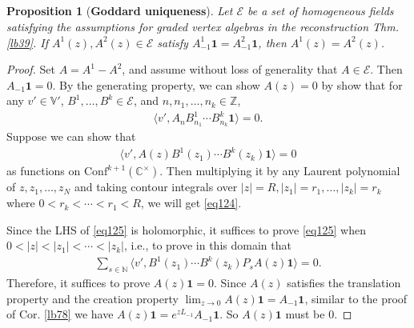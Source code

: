 \documentclass[11pt,b5paper,notitlepage]{article}
\theoremstyle{definition}
\theoremstyle{plain}
\newtheorem{pp}[df]{Proposition}
\newcommand{\mc}{\mathcal}
\newcommand{\id}{\mathbf{1}}
\newcommand{\Conf}{\mathrm{Conf}}
\newcommand{\bk}[1]{\langle {#1}\rangle}
\newcommand{\Vbb}{\mathbb V}
\newcommand{\Cbb}{\mathbb C}
\newcommand{\Nbb}{\mathbb N}
\newcommand{\Zbb}{\mathbb Z}
\numberwithin{equation}{section}
\begin{document}
\subsection{}
\begin{pp}[\textbf{Goddard uniqueness}]\label{lb162}
Let $\mc E$ be a set of homogeneous fields satisfying the assumptions for graded vertex algebras in the reconstruction Thm. \ref{lb39}. If $A^1(z),A^2(z)\in\mc E$ satisfy $A^1_{-1}\id=A^2_{-1}\id$, then $A^1(z)=A^2(z)$.
\end{pp}

\begin{proof}
Set $A=A^1-A^2$, and assume without loss of generality that $A\in\mc E$. Then $A_{-1}\id=0$. By the generating property, we can  show $A(z)=0$ by show that for any $v'\in\Vbb'$, $B^1,\dots,B^k\in\mc E$, and $n,n_1,\dots,n_k\in\Zbb$,
\begin{align}
\bk{v',A_nB^1_{n_1}\cdots B^k_{n_k}\id}=0.	\label{eq124}
\end{align} 
Suppose we can show that
\begin{align}
\bk{v',A(z)B^1(z_1)\cdots B^k(z_k)\id}=0	\label{eq125}
\end{align}
as functions on $\Conf^{k+1}(\Cbb^\times)$. Then multiplying it by any Laurent polynomial of $z,z_1,\dots,z_N$ and taking contour integrals over $|z|=R,|z_1|=r_1,\dots,|z_k|=r_k$ where $0<r_k<\cdots<r_1<R$, we will get \eqref{eq124}.

Since the LHS of \eqref{eq125} is holomorphic, it suffices to prove \eqref{eq125} when $0<|z|<|z_1|<\cdots<|z_k|$, i.e., to prove in this domain that
\begin{align*}
\sum_{s\in\Nbb}\bk{v',B^1(z_1)\cdots B^k(z_k)P_sA(z)\id}=0.	
\end{align*}
Therefore, it suffices to prove $A(z)\id=0$. Since $A(z)$ satisfies the translation property and the creation property $\lim_{z\rightarrow0}A(z)\id=A_{-1}\id$, similar to the proof of Cor. \ref{lb78} we have $A(z)\id=e^{zL_{-1}}A_{-1}\id$. So $A(z)\id$ must be $0$.
\end{proof}



\subsection{}
\end{document}
